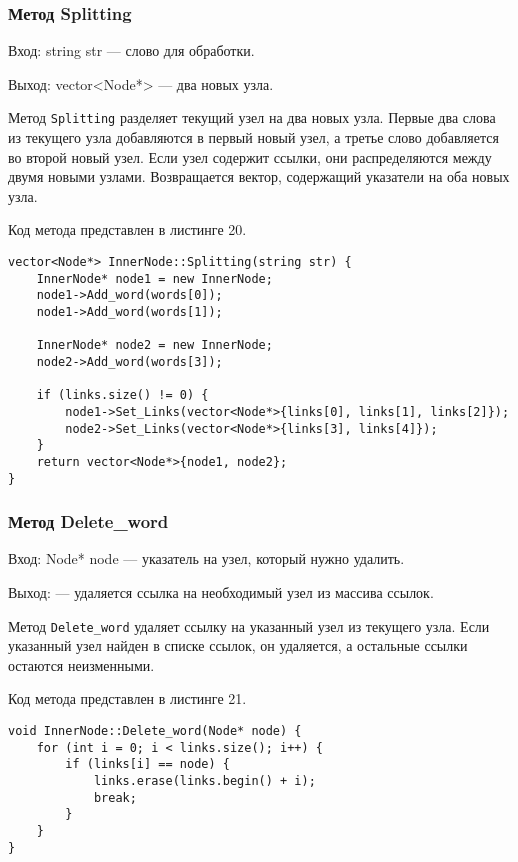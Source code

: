 \documentclass[10pt,a4paper,final]{article} %
\begin{document}
\subsubsection{Метод Splitting}
Вход: string str — слово для обработки. \par
Выход: vector<Node*> — два новых узла. \par
\par Метод \texttt{Splitting} разделяет текущий узел на два новых узла. Первые два слова из текущего узла добавляются в первый новый узел, а третье слово добавляется во второй новый узел. Если узел содержит ссылки, они распределяются между двумя новыми узлами. Возвращается вектор, содержащий указатели на оба новых узла.

Код метода представлен в листинге 20. \begin{lstlisting}[label=splittingInnerNodeMethod, caption = Метод Splitting для класса InnerNode] 
vector<Node*> InnerNode::Splitting(string str) {
	InnerNode* node1 = new InnerNode;
	node1->Add_word(words[0]);
	node1->Add_word(words[1]);
	
	InnerNode* node2 = new InnerNode;
	node2->Add_word(words[3]);
	
	if (links.size() != 0) {
		node1->Set_Links(vector<Node*>{links[0], links[1], links[2]});
		node2->Set_Links(vector<Node*>{links[3], links[4]});
	}
	return vector<Node*>{node1, node2};
}\end{lstlisting}



\subsubsection{Метод Delete\_word}
Вход: Node* node — указатель на узел, который нужно удалить. \par
Выход: — удаляется ссылка на необходимый узел из массива ссылок. \par
\par Метод \texttt{Delete\_word} удаляет ссылку на указанный узел из текущего узла. Если указанный узел найден в списке ссылок, он удаляется, а остальные ссылки остаются неизменными.

Код метода представлен в листинге 21. \begin{lstlisting}[label=deleteWordInnerNodeMethod, caption = Метод Delete\_word для класса InnerNode] 
void InnerNode::Delete_word(Node* node) {
	for (int i = 0; i < links.size(); i++) {
		if (links[i] == node) {
			links.erase(links.begin() + i);
			break;
		}
	}
}\end{lstlisting}
\end{document}
